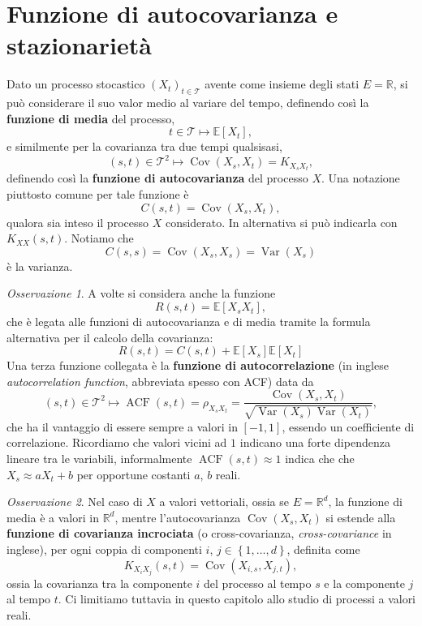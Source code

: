 \documentclass[
  italian,
  letterpaper,
]{book}
\newcommand{\bra}[1]{\left( #1 \right)}
\newcommand{\sqa}[1]{\left[ #1 \right]}
\newcommand{\cur}[1]{\left\{ #1 \right\}}
\newcommand{\R}{\mathbb{R}}
\newcommand{\E}[1]{\mathbb{E}\sqa{#1}}
\newcommand{\Var}[1]{\operatorname{Var}\bra{#1}}
\newcommand{\Cov}[1]{\operatorname{Cov}\bra{#1}}
\theoremstyle{definition}
\theoremstyle{remark}
\newtheorem*{remark}{Osservazione}
\begin{document}
\section{Funzione di autocovarianza e
stazionarietà}\label{sec-stazionari-continui}

Dato un processo stocastico \((X_t)_{t \in \mathcal{T}}\) avente come
insieme degli stati \(E = \R\), si può considerare il suo valor medio al
variare del tempo, definendo così la \textbf{funzione di media} del
processo, \[ t \in \mathcal{T} \mapsto \E{X_t},\] e similmente per la
covarianza tra due tempi qualsisasi,
\[ (s,t ) \in \mathcal{T}^2 \mapsto \Cov{X_s, X_t} = K_{X_s X_t}, \]
definendo così la \textbf{funzione di autocovarianza} del processo
\(X\). Una notazione piuttosto comune per tale funzione è
\[ C(s,t) = \Cov{X_s, X_t},\] qualora sia inteso il processo \(X\)
considerato. In alternativa si può indicarla con \(K_{XX}(s,t)\).
Notiamo che \[ C(s,s) = \Cov{X_s, X_s} = \Var{X_s}\] è la varianza.

\begin{remark}
A volte si considera anche la funzione \[ R(s,t) = \E{ X_s X_t},\] che è
legata alle funzioni di autocovarianza e di media tramite la formula
alternativa per il calcolo della covarianza:
\[ R(s,t) = C(s,t) + \E{X_s} \E{X_t}\] Una terza funzione collegata è la
\textbf{funzione di autocorrelazione} (in inglese \emph{autocorrelation
function}, abbreviata spesso con ACF) data da
\[ (s,t) \in \mathcal{T}^2 \mapsto \operatorname{ACF}(s,t) = \rho_{X_s X_t} = \frac{ \Cov{X_s, X_t}}{ \sqrt{ \Var{X_s} \Var{X_t}} }, \]
che ha il vantaggio di essere sempre a valori in \([-1,1]\), essendo un
coefficiente di correlazione. Ricordiamo che valori vicini ad \(1\)
indicano una forte dipendenza lineare tra le variabili, informalmente
\(\operatorname{ACF}(s,t)\approx 1\) indica che che
\(X_s \approx a X_t +b\) per opportune costanti \(a\), \(b\) reali.
\end{remark}

\begin{remark}
Nel caso di \(X\) a valori vettoriali, ossia se \(E = \R^d\), la
funzione di media è a valori in \(\R^d\), mentre l'autocovarianza
\(\Cov{X_s, X_t}\) si estende alla \textbf{funzione di covarianza
incrociata} (o cross-covarianza, \emph{cross-covariance} in inglese),
per ogni coppia di componenti \(i\), \(j \in \cur{1, \ldots, d}\),
definita come \[K_{X_i X_j}(s,t) = \Cov{X_{i,s}, X_{j,t}},\] ossia la
covarianza tra la componente \(i\) del processo al tempo \(s\) e la
componente \(j\) al tempo \(t\). Ci limitiamo tuttavia in questo
capitolo allo studio di processi a valori reali.
\end{remark}
\end{document}
